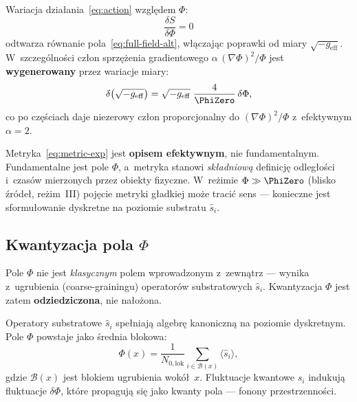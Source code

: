 \begin{proposition}\label{prop:action-consistency}
Wariacja dzia\l{}ania~\eqref{eq:action} wzgl\k{e}dem $\Phi$:
\begin{equation}\label{eq:variation-action}
  \frac{\delta S}{\delta\Phi} = 0
\end{equation}
odtwarza r\'ownanie pola~\eqref{eq:full-field-alt}, w\l{}\k{a}czaj\k{a}c
poprawki od miary $\sqrt{-g_{\mathrm{eff}}}$.
W~szczeg\'olno\'sci cz\l{}on sprz\k{e}\.zenia gradientowego
$\alpha\,(\nabla\Phi)^2/\Phi$ jest \textbf{wygenerowany}
przez wariacje miary:
\begin{equation}
  \delta\bigl(\sqrt{-g_{\mathrm{eff}}}\bigr)
  = \sqrt{-g_{\mathrm{eff}}}\;\frac{4}{\PhiZero}\,\delta\Phi,
\end{equation}
co po cz\k{e}\'sciach daje niezerowy cz\l{}on proporcjonalny
do $(\nabla\Phi)^2/\Phi$ z~efektywnym $\alpha = 2$.
\end{proposition}

\begin{remark}
Metryka~\eqref{eq:metric-exp} jest \textbf{opisem efektywnym},
nie fundamentalnym. Fundamentalne jest pole $\Phi$, a~metryka
stanowi \emph{sk\l{}adniow\k{a}} definicj\k{e} odleg\l{}o\'sci
i~czas\'ow mierzonych przez obiekty fizyczne.
W~re\.zimie $\Phi \gg \PhiZero$ (blisko \'zr\'ode\l{}, re\.zim~III)
poj\k{e}cie metryki g\l{}adkiej mo\.ze traci\'c sens ---
konieczne jest sformu\l{}owanie dyskretne na poziomie
substratu $\hat{s}_i$.
\end{remark}

\subsection{Kwantyzacja pola $\Phi$}\label{ssec:kwantyzacja}

Pole $\Phi$ nie jest \emph{klasycznym} polem wprowadzonym
z~zewn\k{a}trz --- wynika z~ugrubienia (coarse-grainingu)
operator\'ow substratowych $\hat{s}_i$.
Kwantyzacja $\Phi$ jest zatem \textbf{odziedziczona},
nie na\l{}o\.zona.

\begin{remark}\label{rem:inherited-quant}
Operatory substratowe $\hat{s}_i$ spe\l{}niaj\k{a} algebr\k{e}
kanoniczn\k{a} na poziomie dyskretnym. Pole $\Phi$ powstaje
jako \'srednia blokowa:
\begin{equation}
  \Phi(x) = \frac{1}{N_{0,\mathrm{lok}}}\sum_{i \in \mathcal{B}(x)}
  \langle\hat{s}_i\rangle,
\end{equation}
gdzie $\mathcal{B}(x)$ jest blokiem ugrubienia wok\'o\l{}~$x$.
Fluktuacje kwantowe $\hat{s}_i$ indukuj\k{a} fluktuacje
$\delta\Phi$, kt\'ore propaguj\k{a} si\k{e} jako kwanty pola ---
fonony przestrzenno\'sci.
\end{remark}

